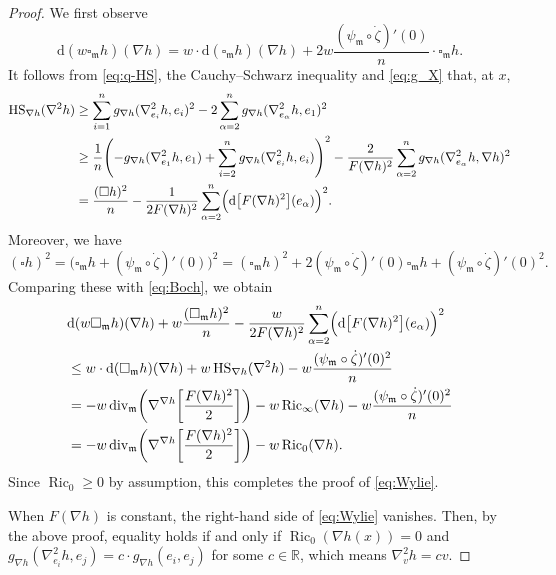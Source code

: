 \documentclass[10pt,a4paper]{amsart}
\def\HS{\mathop{\mathrm{HS}}\nolimits}
\newcommand{\R}{\ensuremath{\mathbb{R}}}
\def\Ric{\mathop{\mathrm{Ric}}\nolimits}
\newcommand{\dd}{\mathrm{d}}
\def\div{\mathop{\mathrm{div}}\nolimits}
\newcommand{\fm}{\ensuremath{\mathfrak{m}}}
\begin{document}
\begin{proof}
We first observe
\[ \dd(w\square_\fm h)(\nabla h)
=w \cdot \dd(\square_\fm h)(\nabla h) +2w\frac{(\psi_\fm \circ \dot{\zeta})'(0)}{n} \cdot \square_\fm h.\]
It follows from \eqref{eq:q-HS}, the Cauchy--Schwarz inequality and \eqref{eq:g_X} that, at $x$,
\begin{align*}
\HS_{\nabla h}(\nabla^2 h)
&\ge \sum_{i=1}^n g_{\nabla h}(\nabla^2_{e_i} h,e_i)^2
-2\sum_{\alpha=2}^n g_{\nabla h}(\nabla^2_{e_\alpha} h,e_1)^2 \\
&\ge \frac{1}{n} \Biggl( -g_{\nabla h}(\nabla^2_{e_1} h,e_1) +\sum_{i=2}^n g_{\nabla h}(\nabla^2_{e_i} h,e_i) \Biggr)^2
-\frac{2}{F(\nabla h)^2} \sum_{\alpha=2}^n g_{\nabla h}(\nabla^2_{e_\alpha} h,\nabla h)^2 \\
&=\frac{(\square h)^2}{n} -\frac{1}{2F(\nabla h)^2} \sum_{\alpha=2}^n \Bigl( \dd\bigl[ F(\nabla h)^2 \bigr](e_\alpha) \Bigr)^2.
\end{align*}
Moreover, we have
\[ (\square h)^2 =\bigl( \square_\fm h +(\psi_\fm \circ \dot{\zeta})'(0) \bigr)^2
= (\square_\fm h)^2 +2(\psi_\fm \circ \dot{\zeta})'(0) \square_\fm h +(\psi_\fm \circ \dot{\zeta})'(0)^2. \]
Comparing these with \eqref{eq:Boch}, we obtain
\begin{align*}
&\dd(w\square_\fm h)(\nabla h) +w \frac{(\square_\fm h)^2}{n} -\frac{w}{2F(\nabla h)^2} \sum_{\alpha=2}^n \Bigl( \dd\bigl[ F(\nabla h)^2 \bigr](e_\alpha) \Bigr)^2 \\
&\le w \cdot \dd(\square_\fm h)(\nabla h) +w\HS_{\nabla h}(\nabla^2 h) -w\frac{(\psi_\fm \circ \dot{\zeta})'(0)^2}{n} \\
&= -w\div_\fm \biggl( \nabla^{\nabla h} \biggl[ \frac{F(\nabla h)^2}{2} \biggr] \biggr) -w\Ric_\infty(\nabla h) -w\frac{(\psi_\fm \circ \dot{\zeta})'(0)^2}{n} \\
&= -w\div_\fm \biggl( \nabla^{\nabla h} \biggl[ \frac{F(\nabla h)^2}{2} \biggr] \biggr) -w\Ric_0(\nabla h).
\end{align*}
Since $\Ric_0 \ge 0$ by assumption, this completes the proof of \eqref{eq:Wylie}.

When $F(\nabla h)$ is constant, the right-hand side of \eqref{eq:Wylie} vanishes.
Then, by the above proof, equality holds if and only if $\Ric_0(\nabla h(x))=0$ and $g_{\nabla h}(\nabla^2_{e_i} h,e_j)=c \cdot g_{\nabla h}(e_i,e_j)$ for some $c \in \R$, which means $\nabla^2_v h=cv$.
\end{proof}
\end{document}
